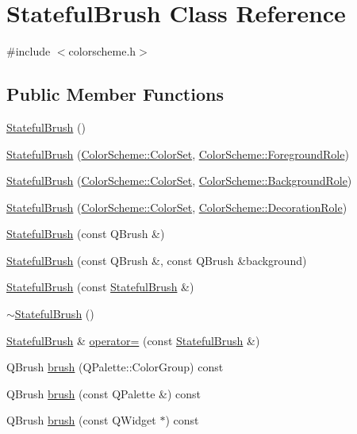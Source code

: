 \hypertarget{class_stateful_brush}{}\section{Stateful\+Brush Class Reference}
\label{class_stateful_brush}


{\ttfamily \#include $<$colorscheme.\+h$>$}

\subsection*{Public Member Functions}
\begin{DoxyCompactItemize}
\item 
\hyperlink{class_stateful_brush_a36ff921f6bd10f7bc4220d5975263bc4}{Stateful\+Brush} ()
\item 
\hyperlink{class_stateful_brush_ab2d1bb4316d486ec896f4cad2ae001f2}{Stateful\+Brush} (\hyperlink{class_color_scheme_a56ea451e86dffa1822ed087902844e05}{Color\+Scheme\+::\+Color\+Set}, \hyperlink{class_color_scheme_ab0f331e829838e82757088db8ce32ab4}{Color\+Scheme\+::\+Foreground\+Role})
\item 
\hyperlink{class_stateful_brush_a37722e1db380bec60352a6088cb1aa5b}{Stateful\+Brush} (\hyperlink{class_color_scheme_a56ea451e86dffa1822ed087902844e05}{Color\+Scheme\+::\+Color\+Set}, \hyperlink{class_color_scheme_a70715e73df1fb0f140797633f8043a8c}{Color\+Scheme\+::\+Background\+Role})
\item 
\hyperlink{class_stateful_brush_a40d7f76bea78e8e48685f030fdbc6c0c}{Stateful\+Brush} (\hyperlink{class_color_scheme_a56ea451e86dffa1822ed087902844e05}{Color\+Scheme\+::\+Color\+Set}, \hyperlink{class_color_scheme_a4ad022af301e30791c6c248e1fc656cf}{Color\+Scheme\+::\+Decoration\+Role})
\item 
\hyperlink{class_stateful_brush_aba6fe316f65f6bc26a630374e8bffea3}{Stateful\+Brush} (const Q\+Brush \&)
\item 
\hyperlink{class_stateful_brush_a70251c65c2aef41bd81d07fa8b5dba60}{Stateful\+Brush} (const Q\+Brush \&, const Q\+Brush \&background)
\item 
\hyperlink{class_stateful_brush_af4916a67dc47a42174de13f2ea6736ba}{Stateful\+Brush} (const \hyperlink{class_stateful_brush}{Stateful\+Brush} \&)
\item 
\hyperlink{class_stateful_brush_a376e4cc7b8d5f76b520dcb2aa27d8161}{$\sim$\+Stateful\+Brush} ()
\item 
\hyperlink{class_stateful_brush}{Stateful\+Brush} \& \hyperlink{class_stateful_brush_a9c97dd9059e6160632611e3484a58219}{operator=} (const \hyperlink{class_stateful_brush}{Stateful\+Brush} \&)
\item 
Q\+Brush \hyperlink{class_stateful_brush_a7019e41f2932aafcefcce57623c4fb2c}{brush} (Q\+Palette\+::\+Color\+Group) const
\item 
Q\+Brush \hyperlink{class_stateful_brush_ab69204943e8c2be8e19640340ce1501d}{brush} (const Q\+Palette \&) const
\item 
Q\+Brush \hyperlink{class_stateful_brush_adc96d0a37f1c4a9b13e4587b82742851}{brush} (const Q\+Widget $\ast$) const
\end{DoxyCompactItemize}


